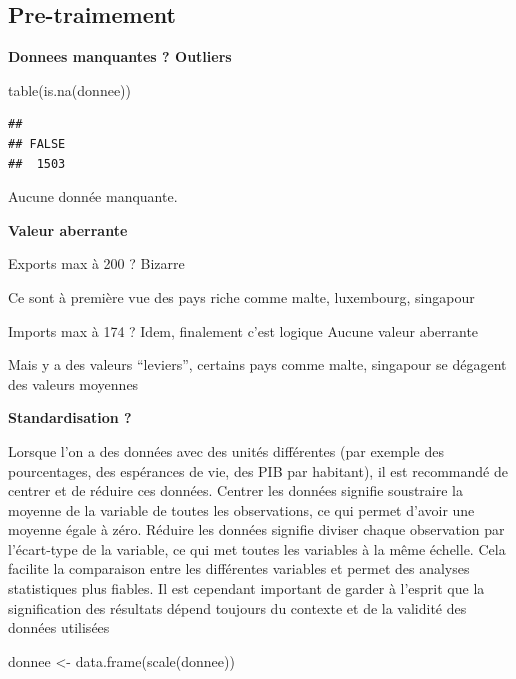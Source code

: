 \documentclass[
]{article}
\newenvironment{Shaded}{}{}
\newcommand{\FunctionTok}[1]{#1}
\newcommand{\NormalTok}[1]{#1}
\newcommand{\OtherTok}[1]{\textcolor[rgb]{1.00,0.25,0.00}{#1}}
\begin{document}
\hypertarget{pre-traimement}{%
\subsection{Pre-traimement}\label{pre-traimement}}

\textbf{Donnees manquantes ? Outliers}

\begin{Shaded}
\begin{Highlighting}[]
\FunctionTok{table}\NormalTok{(}\FunctionTok{is.na}\NormalTok{(donnee))}
\end{Highlighting}
\end{Shaded}

\begin{verbatim}
## 
## FALSE 
##  1503
\end{verbatim}

Aucune donnée manquante.

\textbf{Valeur aberrante}

Exports max à 200 ? Bizarre

Ce sont à première vue des pays riche comme malte, luxembourg, singapour

Imports max à 174 ? Idem, finalement c'est logique Aucune valeur
aberrante

Mais y a des valeurs ``leviers'', certains pays comme malte, singapour
se dégagent des valeurs moyennes

\textbf{Standardisation ?}

Lorsque l'on a des données avec des unités différentes (par exemple des
pourcentages, des espérances de vie, des PIB par habitant), il est
recommandé de centrer et de réduire ces données. Centrer les données
signifie soustraire la moyenne de la variable de toutes les
observations, ce qui permet d'avoir une moyenne égale à zéro. Réduire
les données signifie diviser chaque observation par l'écart-type de la
variable, ce qui met toutes les variables à la même échelle. Cela
facilite la comparaison entre les différentes variables et permet des
analyses statistiques plus fiables. Il est cependant important de garder
à l'esprit que la signification des résultats dépend toujours du
contexte et de la validité des données utilisées

\begin{Shaded}
\begin{Highlighting}[]
\NormalTok{donnee }\OtherTok{\textless{}{-}} \FunctionTok{data.frame}\NormalTok{(}\FunctionTok{scale}\NormalTok{(donnee))}
\end{Highlighting}
\end{Shaded}
\end{document}
